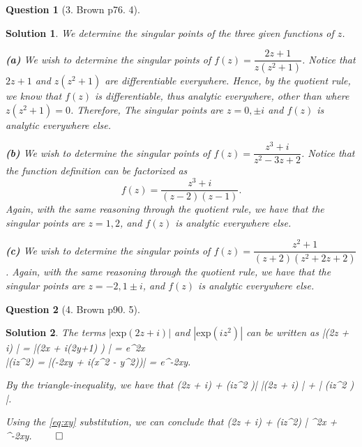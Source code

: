 \documentclass{article} %
\def\eQb#1\eQe{\begin{eqnarray*}#1\end{eqnarray*}}
\def\eQnb#1\eQne{\begin{eqnarray}#1\end{eqnarray}}
\theoremstyle{quest}
\newtheorem*{question}{Question}
\newtheorem*{solution}{Solution}
\begin{document}
\begin{question}[3. Brown p76. 4]
\end{question}
\begin{solution}
We determine the singular points of the three given functions of $z$.

\smallskip

\textbf{(a)} We wish to determine the singular points of $f(z) = \dfrac{2z + 1}{z(z^2+1)}$.
Notice that $2z + 1$ and $z(z^2 + 1)$ are differentiable everywhere. Hence, by the quotient
rule, we know that $f(z)$ is differentiable, thus analytic everywhere, other than where
$z(z^2 + 1) = 0$. Therefore, The singular points are $z = 0, \pm i$ and $f(z)$ is analytic
everywhere else.
\smallskip

\textbf{(b)} We wish to determine the singular points of $f(z) = \dfrac{z^3 + i}{z^2 - 3z + 2}$.
Notice that the function definition can be factorized as
\[
f(z) = \dfrac{z^3 + i}{(z-2)(z-1)}.
\]
Again, with the same reasoning through the quotient rule, we have that 
the singular points are $z = 1,2$, and $f(z)$ is analytic everywhere else.
\smallskip

\textbf{(c)} We wish to determine the singular points of $f(z) = \dfrac{z^2 + 1}{(z+2)
(z^2 + 2z + 2)}$. 
Again, with the same reasoning through the quotient rule, we have that
the singular points are $z=-2, 1 \pm i$, and $f(z)$ is analytic everywhere else. 


\end{solution}

\pagebreak

\begin{question}[4. Brown p90. 5]
\end{question}
\begin{solution}
The terms $| \mathrm{exp}(2z + i) |$ and $| \mathrm{exp}(iz^2 )|$ can be written as
\eQnb \label{eq:xy}
|(2z + i) | = |(2x + i(2y+1) ) | = e^{2x} \\
|(iz^2) = |(-2xy + i(x^2 - y^2))| = e^{-2xy}.
\eQne

By the triangle-inequality, we have that 
\eQb
|(2z + i) + (iz^2 )| \leq 
|(2z + i) | + | (iz^2 ) |. 
\eQe

Using the \ref{eq:xy} substitution, we can conclude that
\eQb
|(2z + i) + (iz^2) | \leq {}^{2x} + ^{-2xy}.
\eQe
$\qed$

\end{solution}
\end{document}
